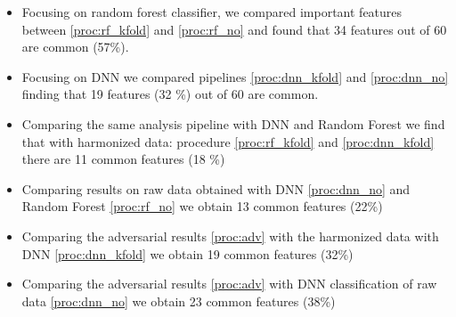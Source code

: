 \documentclass[10pt]{report}
\begin{document}
\begin{itemize}
\item Focusing on random forest classifier, we compared important features between \ref{proc:rf_kfold} and \ref{proc:rf_no} and found that 34 features out of 60 are common (57\%).
\item Focusing on DNN we compared pipelines \ref{proc:dnn_kfold} and \ref{proc:dnn_no} finding that 19 features (32 \%) out of 60 are common.
\item Comparing the same analysis pipeline with DNN and Random Forest we find that with harmonized data: procedure \ref{proc:rf_kfold} and \ref{proc:dnn_kfold} there are 11 common features (18 \%)
\item Comparing results on raw data obtained with DNN \ref{proc:dnn_no} and Random Forest \ref{proc:rf_no} we obtain 13 common features  (22\%)
\item Comparing the adversarial results \ref{proc:adv} with the harmonized data with DNN \ref{proc:dnn_kfold} we obtain 19 common features (32\%)
\item Comparing the adversarial results \ref{proc:adv} with DNN classification of raw data \ref{proc:dnn_no} we obtain 23 common features (38\%)
\end{itemize}








\end{document}
